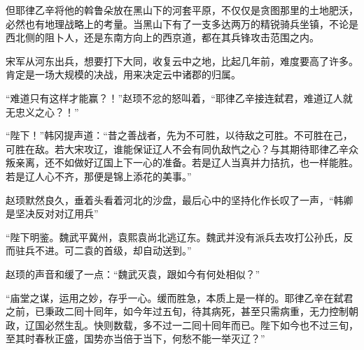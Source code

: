 但耶律乙辛将他的斡鲁朵放在黑山下的河套平原，不仅仅是贪图那里的土地肥沃，必然也有地理战略上的考量。当黑山下有了一支多达两万的精锐骑兵坐镇，不论是西北侧的阻卜人，还是东南方向上的西京道，都在其兵锋攻击范围之内。

宋军从河东出兵，想要打下大同，收复云中之地，比起几年前，难度要高了许多。肯定是一场大规模的决战，用来决定云中诸郡的归属。

“难道只有这样才能赢？！”赵顼不忿的怒叫着，“耶律乙辛接连弑君，难道辽人就无忠义之心？！”

“陛下！”韩冈提声道：“昔之善战者，先为不可胜，以待敌之可胜。不可胜在己，可胜在敌。若大宋攻辽，谁能保证辽人不会有同仇敌忾之心？与其期待耶律乙辛众叛亲离，还不如做好辽国上下一心的准备。若是辽人当真并力拮抗，也一样能胜。若是辽人心不齐，那便是锦上添花的美事。”

赵顼默然良久，垂着头看着河北的沙盘，最后心中的坚持化作长叹了一声，“韩卿是坚决反对对辽用兵”

“陛下明鉴。魏武平冀州，袁熙袁尚北逃辽东。魏武并没有派兵去攻打公孙氏，反而驻兵不进。可二袁的首级，却自动送到。”

赵顼的声音和缓了一点：“魏武灭袁，跟如今有何处相似？”

“庙堂之谋，运用之妙，存乎一心。缓而胜急，本质上是一样的。耶律乙辛在弑君之前，已秉政二囘十囘年，如今年过五旬，待其病死，甚至只需病重，无力控制朝政，辽国必然生乱。快则数载，多不过一二囘十囘年而已。陛下如今也不过三旬，至其时春秋正盛，国势亦当倍于当下，何愁不能一举灭辽？”
